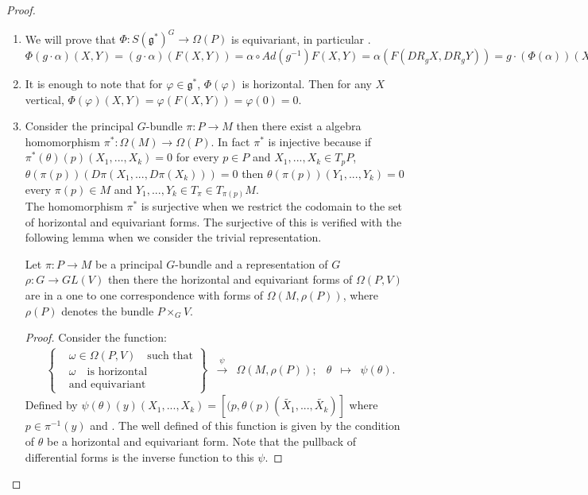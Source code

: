 \begin{proof}
\begin{enumerate}
	\item We will prove that $\Phi: S(\mathfrak{g}^{*})^{G} \to \Omega(P)$ is equivariant, in particular .\\
	$\Phi(g \cdot \alpha)(X,Y)=(g \cdot \alpha )(F(X,Y))= \alpha \circ Ad(g^{-1})F(X,Y)=\alpha(F(DR_{g}X,DR_{g}Y))=g \cdot(\Phi(\alpha))(X,Y)$
	\item It is enough to note that for $\varphi \in \mathfrak{g}^{*}$, $\Phi(\varphi)$ is horizontal. Then for any $X$ vertical, $\Phi(\varphi)(X,Y)=\varphi(F(X,Y))=\varphi(0)=0$.
	\item Consider the principal $G$-bundle $\pi: P \to M$ then there exist a algebra homomorphism $\pi^{*}: \Omega(M) \to \Omega(P)$. In fact $\pi^{*}$ is injective because if $\pi^{*}(\theta)(p)(X_{1},...,X_{k})=0$ for every $p\in P$ and $X_{1},...,X_{k} \in T_{p}P$, $\theta(\pi(p))(D\pi(X_{1},...,D\pi(X_{k})))=0$ then  $\theta(\pi(p))(Y_{1},...,Y_{k})=0$ every $\pi(p) \in M$ and $Y_{1},...,Y_{k} \in T_{\pi} \in T_{\pi(p)}M$.\\
	The homomorphism $\pi^{*}$ is surjective when we restrict the codomain to the set of horizontal and equivariant forms. The surjective of this is verified with the following lemma when we consider the trivial representation.\\
	\begin{lemma}
		Let $\pi: P \to M$ be a principal $G$-bundle and a representation of $G$ $\rho:G \to GL(V)$ then there the horizontal and equivariant forms of $\Omega(P,V)$ are in a one to one correspondence with forms of $\Omega(M,\rho(P))$, where $\rho(P)$ denotes the bundle $P\times_{G}V$.
	\end{lemma}
	\begin{proof}
		Consider the function:
$$\begin{array}{crclccc}
& \left\{\begin{array}{cc}
& \omega \in \Omega(P,V) \quad \text{such that} \\
& \omega \quad \text{is horizontal}\\
& \text{and equivariant}
\end{array}
\right\}    & \xrightarrow{\psi} & \Omega(M,\rho(P)); &\theta & \mapsto & \psi(\theta).
\end{array}$$
Defined by $\psi(\theta)(y)(X_{1},...,X_{k})=[(p, \theta(p)(\tilde{X_{1}},...,\tilde{X_{k}})]$ where $p \in \pi^{-1}(y)$ and . The well defined of this function is given by the condition of $\theta$ be a horizontal and equivariant form.  Note that the pullback of differential forms is the inverse function to this $\psi$.
 


\end{proof}
\end{enumerate}
\end{proof}
